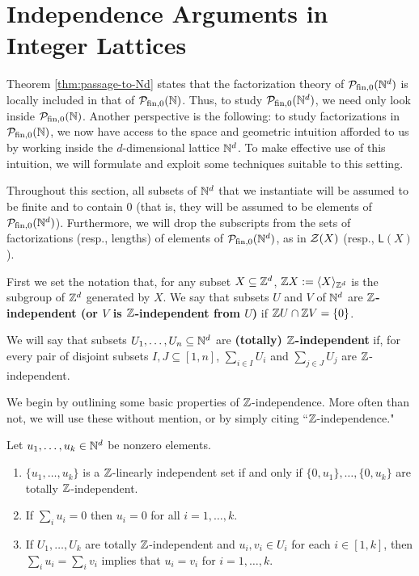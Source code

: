 \section{Independence Arguments in Integer Lattices} \label{sec:independence}

Theorem \ref{thm:passage-to-Nd} states that the factorization theory of $\mathcal{P}_{\textrm{fin}, 0}(\mathbb{N}^d)$ is locally included in that of ${\mathcal{P}_{\textrm{fin},0}(\mathbb{N})}$.
Thus, to study $\mathcal{P}_{\textrm{fin}, 0}(\mathbb{N}^d)$, we need only look inside ${\mathcal{P}_{\textrm{fin},0}(\mathbb{N})}$. 
Another perspective is the following: to study factorizations in ${\mathcal{P}_{\textrm{fin},0}(\mathbb{N})}$, we now have access to the space and geometric intuition afforded to us by working inside the $d$-dimensional lattice $\mathbb{N}^d$.
To make effective use of this intuition, we will formulate and exploit some techniques suitable to this setting.

Throughout this section, all subsets of $\mathbb{N}^d$ that we instantiate will be assumed to be finite and to contain $0$ (that is, they will be assumed to be elements of $\mathcal{P}_{\textrm{fin}, 0}(\mathbb{N}^d)$).
Furthermore, we will drop the subscripts from the sets of factorizations (resp., lengths) of elements of $\mathcal{P}_{\textrm{fin}, 0}(\mathbb{N}^d)$, as in $\mathcal{Z}(X)$ (resp., $\mathsf{L}(X)$).

\begin{defn}
	First we set the notation that, for any subset $X \subseteq \mathbb{Z}^d$, $\mathbb{Z} X := \langle X \rangle_{\mathbb{Z}^d}$ is the subgroup of $\mathbb{Z}^d$ generated by $X$.
	We say that subsets $U$ and $V$ of $\mathbb{N}^d$ are \textbf{$\mathbb{Z}$-independent (or $V$ is $\mathbb{Z}$-independent from $U$)} if $\mathbb{Z} U \cap \mathbb{Z} V = \{0\}$.
	
	We will say that subsets $U_1,\dots, U_n\subseteq \mathbb{N}^d$ are \textbf{(totally) $\mathbb{Z}$-independent} if, for every pair of disjoint subsets $I,J\subseteq[ 1,n ]$, $\sum_{i\in I} U_i$ and $\sum_{j\in J} U_j$ are $\mathbb{Z}$-independent.
\end{defn}

We begin by outlining some basic properties of $\mathbb{Z}$-independence.  
More often than not, we will use these without mention, or by simply citing ``$\mathbb{Z}$-independence."
\begin{prop} \label{prop:eltwise-indep}
	Let $u_1,\dots, u_k\in \mathbb{N}^d$ be nonzero elements.
	\begin{enumerate}[label={\rm (\roman{*})}]
		\item $\{u_1,\dots,u_k\}$ is a $\mathbb{Z}$-linearly independent set if and only if $\{0,u_1\},\dots,\{0,u_k\}$ are totally $\mathbb{Z}$-independent.
		
		\item If $\sum_i u_i = 0$ then $u_i = 0$ for all $i=1,\dots, k$.
		
		\item If $U_1,\dots, U_k$ are totally $\mathbb{Z}$-independent and $u_i, v_i\in U_i$ for each $i\in [ 1,k ]$,
		then $\sum_i u_i = \sum_i v_i$ implies that $u_i = v_i$ for $i = 1,\dots, k$.
	\end{enumerate}
\end{prop}

